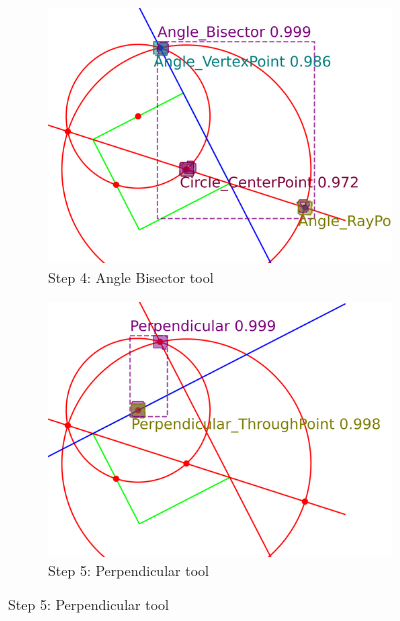 \begin{figure}[!htb]
\begin{subfigure}[t]{0.32\textwidth}
     \end{subfigure}
     \hfill
     \begin{subfigure}[t]{0.32\textwidth}
         \centering
         \includegraphics[width=\textwidth]{img/Delta-10_example/output_image3.png}
         \caption{Step 4: Angle Bisector tool}
         \label{fig:Epsilon12_example_step4}
     \end{subfigure}
     \hfill
     \begin{subfigure}[t]{0.32\textwidth}
         \centering
         \includegraphics[width=\textwidth]{img/Delta-10_example/output_image4.png}
         \caption{Step 5: Perpendicular tool}
         \label{fig:Epsilon12_example_step5}
     \end{subfigure}
     

\end{figure}
